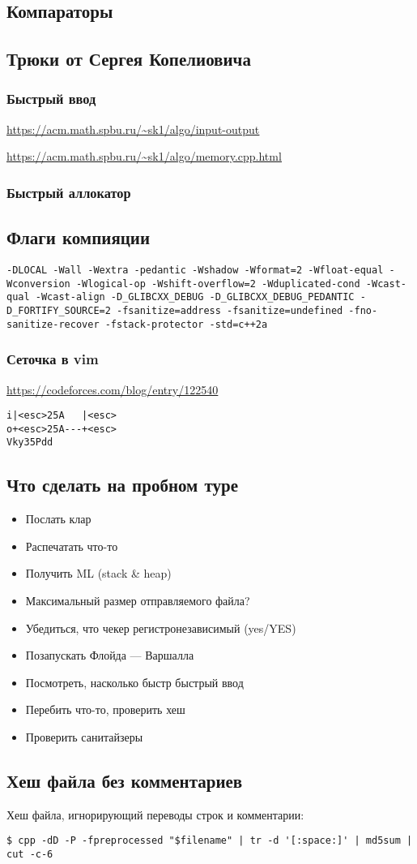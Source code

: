 \subsection{Компараторы}

\subsection{Трюки от Сергея Копелиовича}
\subsubsection{Быстрый ввод}
\underline{\url{https://acm.math.spbu.ru/~sk1/algo/input-output}}

\underline{\url{https://acm.math.spbu.ru/~sk1/algo/memory.cpp.html}}
\subsubsection{Быстрый аллокатор}

\subsection{Флаги компияции}
\texttt{-DLOCAL -Wall -Wextra -pedantic -Wshadow -Wformat=2 -Wfloat-equal -Wconversion -Wlogical-op -Wshift-overflow=2 -Wduplicated-cond -Wcast-qual -Wcast-align -D\_GLIBCXX\_DEBUG -D\_GLIBCXX\_DEBUG\_PEDANTIC -D\_FORTIFY\_SOURCE=2 -fsanitize=address -fsanitize=undefined -fno-sanitize-recover -fstack-protector -std=c++2a}
\subsubsection{Сеточка в vim}
\underline{\url{https://codeforces.com/blog/entry/122540}}

\begin{lstlisting}
i|<esc>25A   |<esc>
o+<esc>25A---+<esc>
Vky35Pdd
\end{lstlisting}
\subsection{Что сделать на пробном туре}
\begin{itemize}
\item Послать клар
\item Распечатать что-то
\item Получить ML (stack \& heap)
\item Максимальный размер отправляемого файла?
\item Убедиться, что чекер регистронезависимый (yes/YES)
\item Позапускать Флойда --- Варшалла
\item Посмотреть, насколько быстр быстрый ввод
\item Перебить что-то, проверить хеш
\item Проверить санитайзеры
\end{itemize}
\subsection{Хеш файла без комментариев}
Хеш файла, игнорирующий переводы строк и комментарии:
\begin{lstlisting}
$ cpp -dD -P -fpreprocessed "$filename" | tr -d '[:space:]' | md5sum | cut -c-6
\end{lstlisting}
